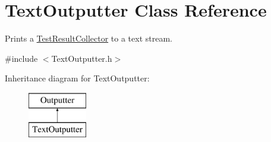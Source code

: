 \hypertarget{class_text_outputter}{\section{Text\-Outputter Class Reference}
\label{class_text_outputter}
}


Prints a \hyperlink{class_test_result_collector}{Test\-Result\-Collector} to a text stream.  




{\ttfamily \#include $<$Text\-Outputter.\-h$>$}

Inheritance diagram for Text\-Outputter\-:\begin{figure}[H]
\begin{center}
\leavevmode
\includegraphics[height=2.000000cm]{class_text_outputter}
\end{center}
\end{figure}
